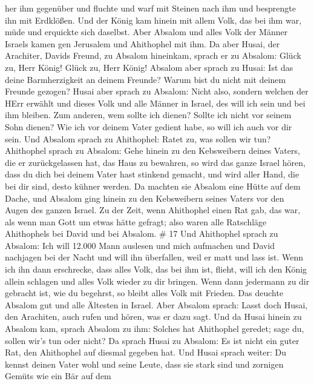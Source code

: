 her ihm gegenüber und fluchte und warf mit Steinen nach ihm und
besprengte ihn mit Erdklößen.  Und der König kam hinein mit
allem Volk, das bei ihm war, müde und erquickte sich daselbst.
 Aber Absalom und alles Volk der Männer Israels kamen gen
Jerusalem und Ahithophel mit ihm.  Da aber Husai, der
Arachiter, Davids Freund, zu Absalom hineinkam, sprach er zu Absalom:
Glück zu, Herr König! Glück zu, Herr König!  Absalom aber
sprach zu Husai: Ist das deine Barmherzigkeit an deinem Freunde? Warum
bist du nicht mit deinem Freunde gezogen?  Husai aber
sprach zu Absalom: Nicht also, sondern welchen der HErr erwählt und
dieses Volk und alle Männer in Israel, des will ich sein und bei ihm
bleiben.  Zum anderen, wem sollte ich dienen? Sollte ich
nicht vor seinem Sohn dienen? Wie ich vor deinem Vater gedient habe, so
will ich auch vor dir sein.  Und Absalom sprach zu
Ahithophel: Ratet zu, was sollen wir tun?  Ahithophel
sprach zu Absalom: Gehe hinein zu den Kebsweibern deines Vaters, die er
zurückgelassen hat, das Haus zu bewahren, so wird das ganze Israel
hören, dass du dich bei deinem Vater hast stinkend gemacht, und wird
aller Hand, die bei dir sind, desto kühner werden.  Da
machten sie Absalom eine Hütte auf dem Dache, und Absalom ging hinein zu
den Kebsweibern seines Vaters vor den Augen des ganzen Israel.
 Zu der Zeit, wenn Ahithophel einen Rat gab, das war, als
wenn man Gott um etwas hätte gefragt; also waren alle Ratschläge
Ahithophels bei David und bei Absalom. \# 17  Und Ahithophel
sprach zu Absalom: Ich will 12.000 Mann auslesen und mich aufmachen und
David nachjagen bei der Nacht  und will ihn überfallen, weil
er matt und lass ist. Wenn ich ihn dann erschrecke, dass alles Volk, das
bei ihm ist, flieht, will ich den König allein schlagen  und
alles Volk wieder zu dir bringen. Wenn dann jedermann zu dir gebracht
ist, wie du begehrst, so bleibt alles Volk mit Frieden.  Das
deuchte Absalom gut und alle Ältesten in Israel.  Aber
Absalom sprach: Lasst doch Husai, den Arachiten, auch rufen und hören,
was er dazu sagt.  Und da Husai hinein zu Absalom kam,
sprach Absalom zu ihm: Solches hat Ahithophel geredet; sage du, sollen
wir's tun oder nicht?  Da sprach Husai zu Absalom: Es ist
nicht ein guter Rat, den Ahithophel auf diesmal gegeben hat.
 Und Husai sprach weiter: Du kennst deinen Vater wohl und
seine Leute, dass sie stark sind und zornigen Gemüts wie ein Bär auf dem
